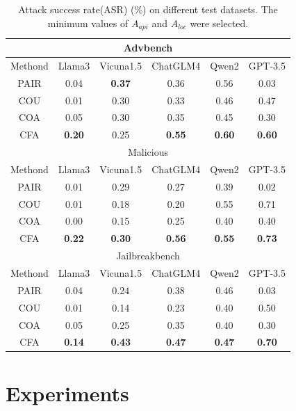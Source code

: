 \begin{table}
\fontsize{7}{8}\selectfont{}
\begin{center}
\begin{tabular}{c|c|c|c|c|c} 
\hline
\multicolumn{6}{c}{Advbench} \\ \hline
{Methond} & {Llama3} & {Vicuna1.5} & {ChatGLM4} & {Qwen2} & {GPT-3.5}  \\ \hline
PAIR & 0.04 & \textbf{0.37} & 0.36 & 0.56 & 0.03 \\ 
COU & 0.01 & 0.30 & 0.33 & 0.46 & 0.47  \\ 
COA & 0.05 & 0.30 & 0.35 & 0.45 & 0.30  \\ 
CFA & \textbf{0.20} & 0.25 & \textbf{0.55} & \textbf{0.60} & \textbf{0.60}  \\ 
\hline

\multicolumn{6}{c}{Malicious} \\ \hline
{Methond} & {Llama3} & {Vicuna1.5} & {ChatGLM4} & {Qwen2} & {GPT-3.5}  \\ \hline
PAIR & 0.01 & 0.29 & 0.27 & 0.39 & 0.02 \\ 
COU & 0.01 & 0.18 & 0.20 & 0.55 & 0.71  \\ 
COA & 0.00 & 0.15 & 0.25 & 0.40 & 0.40  \\ 
CFA & \textbf{0.22} & \textbf{0.30} &\textbf{0.56} & \textbf{0.55} & \textbf{0.73}  \\
\hline

\multicolumn{6}{c}{Jailbreakbench} \\ \hline
{Methond} & {Llama3} & {Vicuna1.5} & {ChatGLM4} & {Qwen2} & {GPT-3.5}  \\ \hline
PAIR & 0.04 & 0.24 & 0.38 & 0.46 & 0.03 \\ 
COU & 0.01 & 0.14 & 0.23 & 0.40 & 0.50  \\ 
COA & 0.05 & 0.25 & 0.35 & 0.40 & 0.30  \\ 
CFA & \textbf{0.14} & \textbf{0.43} & \textbf{0.47} & \textbf{0.47} & \textbf{0.70}  \\ 
\hline
\end{tabular}
\caption{\label{table:public}Attack success rate(ASR) (\%) on different test datasets. The minimum values of $A_{api}$ and $A_{loc}$ were selected.}
\end{center}
\end{table}


\section{Experiments}\label{exp}

